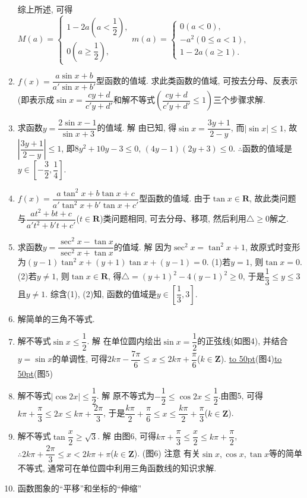 \documentclass[10pt,a4paper]{article}
\newcommand{\blank}[1]{\underline{\hbox to #1pt{}}}
\begin{document}
\begin{enumerate}[1.]
综上所述, 可得$M(a)=\begin{cases}
    1-2a  (a<\dfrac 12),  \\0  (a\ge \dfrac 12),  \end{cases} m(a)=\begin{cases}
    0  (a<0),  \\-a^2  (0\le a<1),  \\1-2a  (a\ge 1).  \end{cases}$
\item $f(x)=\dfrac{a\sin x+b}{a'\sin x+b'}$型函数的值域.
求此类函数的值域, 可按去分母、反表示(即表示成$\sin x=\dfrac{cy+d}{c'y+d'}$和解不等式$(\dfrac{cy+d}{c'y+d'}\le 1)$三个步骤求解.
\item 求函数$y=\dfrac{2\sin x-1}{\sin x+3}$的值域.
解  由已知, 得$\sin x=\dfrac{3y+1}{2-y}$, 而$|\sin x|\le 1$, 故$|\dfrac{3y+1}{2-y}|\le 1$,
即$8y^2+10y-3\le 0$, $(4y-1)(2y+3)\le 0$.  $\therefore$函数的值域是$y\in [-\dfrac 32,\dfrac 14]$.
\item $f(x)=\dfrac{a\tan ^2x+b\tan x+c}{a'\tan ^2x+b'\tan x+c'}$型函数的值域.
由于$\tan x\in \mathbf{R}$, 故此类问题与$\dfrac{at^2+bt+c}{a't^2+b't+c'}$($t\in \mathbf{R}$)类问题相同, 可去分母、移项, 然后利用$\triangle \ge 0$解之.
\item 求函数$y=\dfrac{\sec ^2x-\tan x}{\sec ^2x+\tan x}$的值域.
解  因为$\sec ^2x=\tan ^2x+1$, 故原式时变形为$(y-1)\tan ^2x+(y+1)\tan x+(y-1)=0$.
(1)若$y=1$, 则$\tan x=0$.
(2)若$y\ne 1$, 则$\tan x\in \mathbf{R}$, 得$\triangle =(y+1)^2-4(y-1)^2\ge 0$, 于是$\dfrac 13\le y\le 3$且$y\ne 1$.
综含(1), (2)知, 函数的值域是$y\in [\dfrac 13,3]$.
\item 解简单的三角不等式.
\item 解不等式$\sin x\le \dfrac 12$.
解  在单位圆内绘出$\sin x=\dfrac 12$的正弦线(如图4), 并结合$y=\sin x$的单调性, 可得$2k\pi -\dfrac{7\pi }6\le x\le 2k\pi +\dfrac{\pi }6$($k\in \mathbf{Z}$).
\blank{50}(图4)\blank{50}(图5)
\item 解不等式$|\cos 2x|\le \dfrac 12$.
解  原不等式为$-\dfrac 12\le \cos 2x\le \dfrac 12$.由图5, 可得$k\pi +\dfrac{\pi }3\le 2x\le k\pi +\dfrac{2\pi }3$,
于是$\dfrac{k\pi }2+\dfrac{\pi }6\le x\le \dfrac{k\pi }2+\dfrac{\pi }3$($k\in \mathbf{Z}$).
\item 解不等式$\tan \dfrac x2\ge \sqrt 3$.
解  由图6, 可得$k\pi +\dfrac{\pi }3\le \dfrac x2\le k\pi +\dfrac{\pi }2$,
$\therefore 2k\pi +\dfrac{2\pi }3\le x<2k\pi +\pi$($k\in \mathbf{Z}$).
(图6)
注意  有关$\sin x,\cos x,\tan x$等的简单不等式, 通常可在单位圆中利用三角函数线的知识求解.
\item 函数图象的``平移''和坐标的``伸缩''

\end{enumerate}
\end{document}
